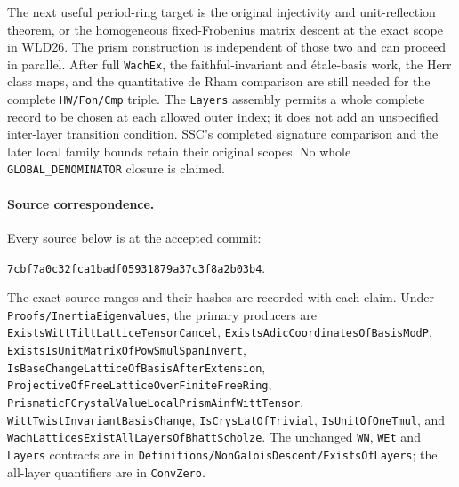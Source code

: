 The next useful period-ring target is the original injectivity and
unit-reflection theorem, or the homogeneous fixed-Frobenius matrix
descent at the exact scope in WLD26. The prism construction is
independent of those two and can proceed in parallel. After full
\texttt{Wach\allowbreak Ex}, the faithful-invariant and \'etale-basis work,
the Herr class maps, and the quantitative de Rham comparison are
still needed for the complete \texttt{HW/\allowbreak Fon/\allowbreak Cmp} triple.
The \texttt{Layers} assembly permits a whole complete record to be
chosen at each allowed outer index; it does not add an unspecified
inter-layer transition condition. SSC's completed signature comparison
and the later local family bounds retain their original scopes.
No whole \texttt{GLOBAL\_\allowbreak DENOMINATOR} closure is claimed.

\paragraph{Source correspondence.}
Every source below is at the accepted commit:
\par\noindent\texttt{7cbf7a0c32fca1badf05931879a37c3f8a2b03b4}.
\par\noindent
The exact source ranges and their hashes are recorded with each claim.
Under \texttt{Proofs/\allowbreak Inertia\allowbreak Eigenvalues}, the primary producers are
\texttt{Exists\allowbreak Witt\allowbreak Tilt\allowbreak Lattice\allowbreak Tensor\allowbreak Cancel},
\texttt{Exists\allowbreak Adic\allowbreak Coordinates\allowbreak Of\allowbreak Basis\allowbreak Mod\allowbreak P},
\texttt{Exists\allowbreak Is\allowbreak Unit\allowbreak Matrix\allowbreak Of\allowbreak Pow\allowbreak Smul\allowbreak Span\allowbreak Invert},
\texttt{Is\allowbreak Base\allowbreak Change\allowbreak Lattice\allowbreak Of\allowbreak Basis\allowbreak After\allowbreak Extension},
\texttt{Projective\allowbreak Of\allowbreak Free\allowbreak Lattice\allowbreak Over\allowbreak Finite\allowbreak Free\allowbreak Ring},
\texttt{Prismatic\allowbreak FCrystal\allowbreak Value\allowbreak Local\allowbreak Prism\allowbreak Ainf\allowbreak Witt\allowbreak Tensor},
\texttt{Witt\allowbreak Twist\allowbreak Invariant\allowbreak Basis\allowbreak Change},
\texttt{Is\allowbreak Crys\allowbreak Lat\allowbreak Of\allowbreak Trivial}, \texttt{Is\allowbreak Unit\allowbreak Of\allowbreak One\allowbreak Tmul}, and
\texttt{Wach\allowbreak Lattices\allowbreak Exist\allowbreak All\allowbreak Layers\allowbreak Of\allowbreak Bhatt\allowbreak Scholze}.
The unchanged \texttt{WN}, \texttt{WEt} and \texttt{Layers}
contracts are in \texttt{Definitions/\allowbreak Non\allowbreak Galois\allowbreak Descent/\allowbreak Exists\allowbreak Of\allowbreak Layers};
the all-layer quantifiers are in \texttt{Conv\allowbreak Zero}.





